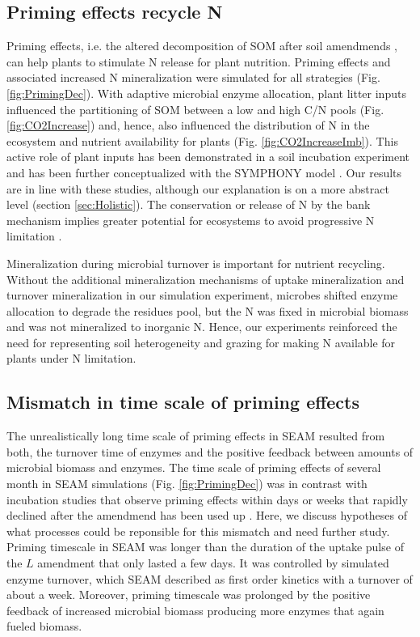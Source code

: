 \subsection{Priming effects recycle N}
Priming effects, i.e. the altered decomposition of SOM after soil amendmends
\citep{Kuzyakov00}, can help plants to stimulate N release for plant nutrition.
Priming effects and associated increased N mineralization were simulated for all
strategies (Fig. \ref{fig:PrimingDec}). With adaptive microbial enzyme
allocation, plant litter inputs influenced the partitioning of SOM between a low
and high C/N pools (Fig. \ref{fig:CO2Increase}) and, hence,
also influenced the distribution of N in the ecosystem and nutrient
availability for plants (Fig. \ref{fig:CO2IncreaseImb}). This active role of
plant inputs has been demonstrated in a soil incubation experiment
\citep{Fontaine11} and has been further conceptualized with the SYMPHONY model
\citep{Perveen14}. Our results are in line with these studies, although our
explanation is on a more abstract level (section \ref{sec:Holistic}). The
conservation or release of N by the bank mechanism implies greater potential
for ecosystems to avoid progressive N limitation \citep{Norby10, Franklin14, Averill15}.

Mineralization during microbial turnover is important for nutrient recycling.
Without the additional mineralization mechanisms of uptake mineralization
\citep{Manzoni08} and turnover mineralization \citep{Clarholm85, Raynaud06} in
our simulation experiment, microbes shifted enzyme allocation to degrade the
residues pool, but the N was fixed in microbial biomass and was not mineralized
to inorganic N. Hence, our experiments reinforced the need for representing soil
heterogeneity and grazing for making N available for plants under N limitation.

\subsection{Mismatch in time scale of priming effects}
The unrealistically long time scale of priming effects in SEAM resulted from
both, the turnover time of enzymes and the positive feedback between amounts of
microbial biomass and enzymes. The time scale of priming effects of several
month in SEAM simulations (Fig. \ref{fig:PrimingDec}) was in contrast with incubation
studies that observe priming effects within days or weeks that rapidly
declined after the amendmend has been used up \citep{Blagodatskaya14}. Here, we
discuss hypotheses of what processes could be reponsible for this mismatch and
need further study.
Priming timescale in SEAM was longer than the duration of the uptake pulse of
the $L$ amendment that only lasted a few days. It was controlled by simulated
enzyme turnover, which SEAM described as first order kinetics with a turnover of
about a week. Moreover, priming timescale was prolonged by the
positive feedback of increased microbial biomass producing more enzymes that
again fueled biomass.

